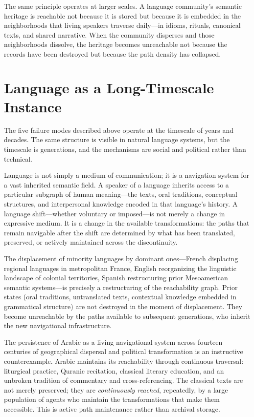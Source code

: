 \documentclass[12pt]{article}
\begin{document}
The same principle operates at larger scales.
A language community's semantic heritage is reachable not because
it is stored but because it is embedded in the neighborhoods that
living speakers traverse daily---in idioms, rituals, canonical
texts, and shared narrative.
When the community disperses and those neighborhoods dissolve, the
heritage becomes unreachable not because the records have been
destroyed but because the path density has collapsed.

\section{Language as a Long-Timescale Instance}

The five failure modes described above operate at the timescale of years and
decades.
The same structure is visible in natural language systems, but the timescale
is generations, and the mechanisms are social and political rather than
technical.

Language is not simply a medium of communication; it is a navigation system
for a vast inherited semantic field.
A speaker of a language inherits access to a particular subgraph of human
meaning---the texts, oral traditions, conceptual structures, and
interpersonal knowledge encoded in that language's history.
A language shift---whether voluntary or imposed---is not merely a change in
expressive medium.
It is a change in the available transformations: the paths that remain
navigable after the shift are determined by what has been translated,
preserved, or actively maintained across the discontinuity.

The displacement of minority languages by dominant ones---French displacing
regional languages in metropolitan France, English reorganizing the
linguistic landscape of colonial territories, Spanish restructuring prior
Mesoamerican semantic systems---is precisely a restructuring of the
reachability graph.
Prior states (oral traditions, untranslated texts, contextual knowledge
embedded in grammatical structure) are not destroyed in the moment of
displacement.
They become unreachable by the paths available to subsequent generations,
who inherit the new navigational infrastructure.

The persistence of Arabic as a living navigational system across fourteen
centuries of geographical dispersal and political transformation is an
instructive counterexample.
Arabic maintains its reachability through continuous traversal: liturgical
practice, Quranic recitation, classical literary education, and an
unbroken tradition of commentary and cross-referencing.
The classical texts are not merely preserved; they are \emph{continuously
reached}, repeatedly, by a large population of agents who maintain the
transformations that make them accessible.
This is active path maintenance rather than archival storage.
\end{document}
